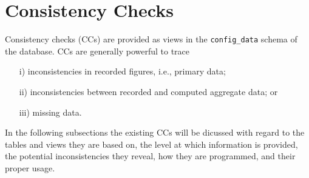 \section{Consistency Checks}\label{sec_consistency_checks}

Consistency checks (CCs) are provided as views in the \texttt{\footnotesize config\_data} schema of the database.
CCs are generally powerful to trace  
\begin{itemize}
\item[i)]inconsistencies in recorded figures, i.e., primary data;
\item[ii)]inconsistencies between recorded and computed aggregate data;
or 
\item[iii)] missing data.
\end{itemize}

In the following subsections the existing CCs will be dicussed with regard to the tables and views they are based on, the level at which information is provided, the potential inconsistencies they reveal, how they are programmed, and their proper usage.

		
		
		
		
		
		
		

		
		
		
		
		
		

		
		
		
		
		
		

		
		

		
		
		
		
		
		
		
		
		